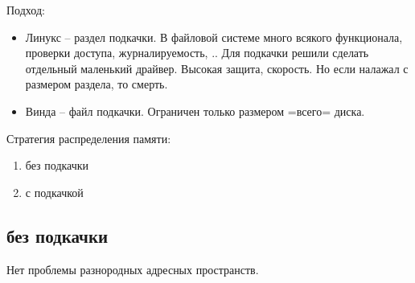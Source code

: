 \documentclass{book}
\theoremstyle{definition}
\begin{document}
Подход:
\begin{itemize}
    \item Линукс -- раздел подкачки. В файловой системе много всякого функционала, проверки доступа, журналируемость, .. Для подкачки решили сделать отдельный маленький драйвер. Высокая защита, скорость. Но если налажал с размером раздела, то смерть.
    \item Винда -- файл подкачки. Ограничен только размером =всего= диска.
\end{itemize}

Стратегия распределения памяти:
\begin{enumerate}
    \item без подкачки
    \item с подкачкой
\end{enumerate}

\subsection{без подкачки}

Нет проблемы разнородных адресных пространств.
\end{document}
